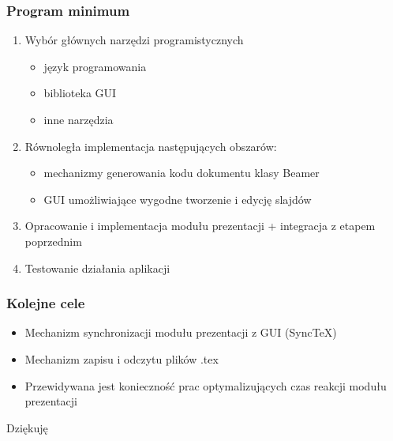 \documentclass[t]{beamer}
\begin{document}
\begin{frame}
	\frametitle{Program minimum}
	\begin{enumerate}
		\item Wybór głównych narzędzi programistycznych
			\begin{itemize}
				\item język programowania
				\item biblioteka GUI
				\item inne narzędzia
			\end{itemize}
		\item Równoległa implementacja następujących obszarów:
			\begin{itemize}
				\item mechanizmy generowania kodu dokumentu klasy Beamer
				\item GUI umożliwiające wygodne tworzenie i edycję slajdów
			\end{itemize}
		\item Opracowanie i implementacja modułu prezentacji + integracja z etapem poprzednim
		\item Testowanie działania aplikacji
	\end{enumerate}
\end{frame}

\begin{frame}
	\frametitle{Kolejne cele}
	\begin{itemize}
		\item Mechanizm synchronizacji modułu prezentacji z GUI (SyncTeX)
		\item Mechanizm zapisu i odczytu plików .tex
		\item Przewidywana jest konieczność prac optymalizujących czas reakcji modułu prezentacji
	\end{itemize}	
\end{frame}

\begin{frame}[c]
	\Huge Dziękuję
\end{frame}
\end{document}
